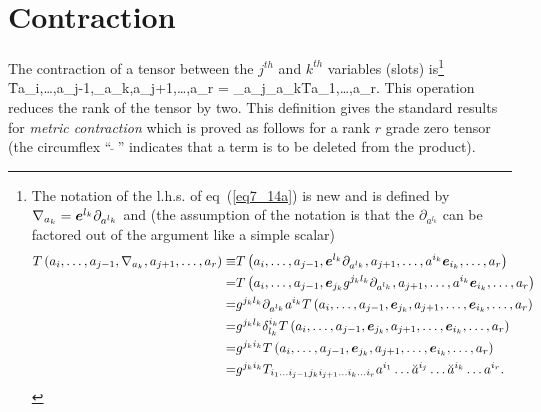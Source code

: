 \section{Contraction}
The contraction of a tensor between the $j^{th}$ and $k^{th}$ variables (slots) is\footnote{The notation of the l.h.s. of 
eq~(\ref{eq7_14a}) is new and is defined by $\nabla_{a_{k}} = \bm{e}^{l_{k}}\partial_{a^{l_{k}}}$ and (the assumption of the
notation is that the $\partial_{a^{l_{k}}}$ can be factored out of the argument like a simple scalar)
\begin{align*}
	{T}\left ( {a_{i},\dots,a_{j-1},\nabla_{a_{k}},a_{j+1},\dots,a_{r}} \right ) \equiv& 
		{T}\left ( {a_{i},\dots,a_{j-1},\bm{e}^{l_{k}}\partial_{a^{l_{k}}},a_{j+1},\dots,a^{i_{k}}\bm{e}_{i_{k}},\dots,a_{r}} \right ) \\
	=& {T}\left ( {a_{i},\dots,a_{j-1},\bm{e}_{j_{k}}g^{j_{k}l_{k}}\partial_{a^{l_{k}}},a_{j+1},\dots,a^{i_{k}}\bm{e}_{i_{k}},\dots,a_{r}} \right ) \\
	=& g^{j_{k}l_{k}}\partial_{a^{l_{k}}}a^{i_{k}}{T}\left ( {a_{i},\dots,a_{j-1},\bm{e}_{j_{k}},a_{j+1},\dots,\bm{e}_{i_{k}},\dots,a_{r}} \right ) \\
	=& g^{j_{k}l_{k}}\delta_{l_{k}}^{i_{k}}{T}\left ( {a_{i},\dots,a_{j-1},\bm{e}_{j_{k}},a_{j+1},\dots,\bm{e}_{i_{k}},\dots,a_{r}} \right ) \\
	=& g^{j_{k}i_{k}}{T}\left ( {a_{i},\dots,a_{j-1},\bm{e}_{j_{k}},a_{j+1},\dots,\bm{e}_{i_{k}},\dots,a_{r}} \right ) \\
	=& g^{j_{k}i_{k}}T_{i_{1}\dots i_{j-1}j_{k}i_{j+1}\dots i_{k}\dots i_{r}}
		a^{i_{1}}\dots\breve{a}^{i_{j}}\dots\breve{a}^{i_{k}}\dots a^{i_{r}}.
\end{align*}}
\be
	\f{T}{a_{i},\dots,a_{j-1},\nabla_{a_{k}},a_{j+1},\dots,a_{r}} = \nabla_{a_{j}}\cdot\lp\nabla_{a_{k}}\f{T}{a_{1},\dots,a_{r}}\rp.\label{eq7_14a}
\ee
This operation reduces the rank of the tensor by two.  This definition gives the standard results for \emph{metric contraction} which is
proved as follows for a rank $r$ grade zero tensor (the circumflex ``$\breve{\:\:}$'' indicates that a term is to be deleted from the product).
